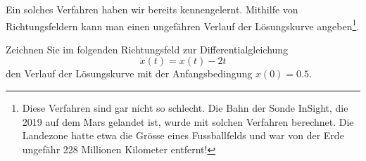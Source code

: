 Ein solches Verfahren haben wir bereits kennengelernt.
Mithilfe von Richtungsfeldern kann man einen ungefähren Verlauf
der Lösungskurve angeben\footnote{Diese Verfahren sind gar nicht so schlecht. Die Bahn der Sonde InSight, die 2019 auf dem Mars gelandet ist, wurde mit
    solchen Verfahren berechnet. Die Landezone hatte etwa die Grösse eines Fussballfelds und war von der Erde ungefähr 228
    Millionen Kilometer entfernt!}.

Zeichnen Sie im folgenden Richtungsfeld zur Differentialgleichung
\[
    \dot{x}(t)=x(t)-2t
\]
den Verlauf der Lösungskurve mit der Anfangsbedingung \(x(0)=0.5\).

\begin{center}
\end{center}
